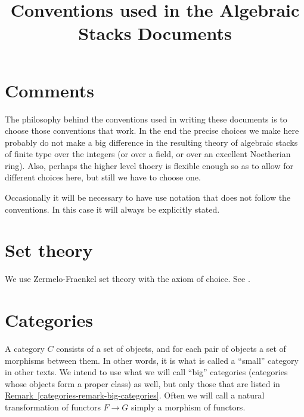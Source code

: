 

%


\title{Conventions used in the Algebraic Stacks Documents}


\maketitle

\tableofcontents

\section{Comments}
\label{section-comments}

\noindent
The philosophy behind the conventions used in writing these documents is
to choose those conventions that work. In the end the precise choices we 
make here probably do not make a big difference in the resulting theory 
of algebraic stacks of finite type over the integers (or over a field, 
or over an excellent Noetherian ring). Also, perhaps the higher level
thoery is flexible enough so as to allow for different choices here, but
still we have to choose one.

\smallskip\noindent
Occasionally it will be necessary to have use notation that does not follow 
the conventions. In this case it will always be explicitly stated.

\section{Set theory} 
\label{section-sets}

\noindent
We use Zermelo-Fraenkel set theory with the axiom of choice.
See \cite{Kunen}.

\section{Categories} 
\label{section-categories}

\noindent
A category $C$ consists of a set of objects, and for each pair of objects
a set of morphisms between them. In other words, it is what is called
a ``small'' category in other texts. We intend to use what we will
call ``big'' categories (categories whose objects form a proper class)
as well, but only those that are listed in
\hyperref[categories-remark-big-categories]%
{Remark~\ref*{categories-remark-big-categories}}. Often we will
call a natural transformation of functors $F \to G$ simply a morphism of
functors.

